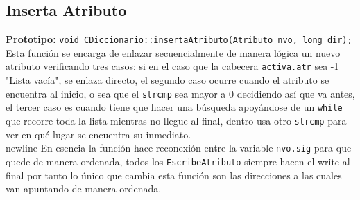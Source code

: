 \documentclass[12pt]{article}
\begin{document}
{}
\subsection*{Inserta Atributo}
\textbf{Prototipo:} \verb|void CDiccionario::insertaAtributo(Atributo nvo, long dir);|\\
Esta función se encarga de enlazar secuencialmente de manera lógica un nuevo atributo verificando tres casos: si en el caso que la cabecera \verb|activa.atr| sea -1 "Lista vacía", se enlaza directo, el segundo caso ocurre cuando el atributo se encuentra al inicio, o sea que el \verb|strcmp| sea mayor a 0 decidiendo así que va antes, el tercer caso es cuando tiene que hacer una búsqueda apoyándose de un \verb|while| que recorre toda la lista mientras no llegue al final, dentro usa otro \verb|strcmp| para ver en qué lugar se encuentra su inmediato.\\newline
En esencia la función hace reconexión entre la variable 
\verb|nvo.sig| para que quede de manera ordenada, todos los 
\verb|EscribeAtributo| siempre hacen el write al final por 
tanto lo único que cambia esta función son las direcciones a 
las cuales van apuntando de manera ordenada.

\end{document}
